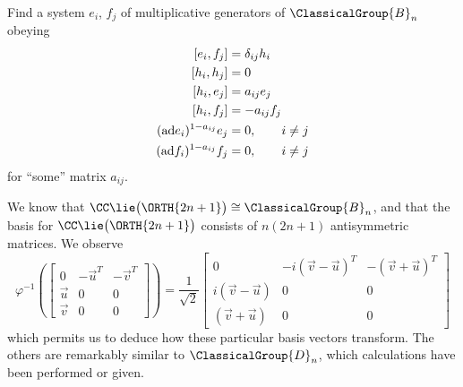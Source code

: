 \begin{exercise}
Find a system $e_{i}$, $f_{j}$ of multiplicative generators of
$\ClassicalGroup{B}_{n}$ obeying
\begin{subequations}
\begin{align}
[e_{i},f_{j}]&=\delta_{ij}h_{i}\\
[h_{i},h_{j}]&=0\\
[h_{i},e_{j}]&=a_{ij}e_{j}\\
[h_{i},f_{j}]&=-a_{ij}f_{j}\\
({\rm ad}e_{i})^{1-a_{ij}}e_{j}&=0,\qquad i\not=j\\
({\rm ad}f_{i})^{1-a_{ij}}f_{j}&=0,\qquad i\not=j
\end{align}
\end{subequations}
for ``some'' matrix $a_{ij}$.
\end{exercise}
\answer We know that $\CC\lie\big(\ORTH{2n+1}\big)\cong \ClassicalGroup{B}_{n}$, and that
the basis for $\CC\lie\big(\ORTH{2n+1}\big)$ consists of $n(2n+1)$
antisymmetric matrices. We observe
\begin{equation}
\varphi^{-1}\left(
\begin{bmatrix}
0 & -\vec{u}^{T} & -\vec{v}^{T}\\
\vec{u} & 0 & 0\\
\vec{v} & 0 & 0
\end{bmatrix}
\right)
=
\frac{1}{\sqrt{2}}\begin{bmatrix}
0                   & -i(\vec{v}-\vec{u})^{T} & -(\vec{v}+\vec{u})^{T}\\
i(\vec{v}-\vec{u})  & 0                      &0\\
(\vec{v}+\vec{u})   & 0                      &0
\end{bmatrix}
\end{equation}
which permits us to deduce how these particular basis vectors
transform. The others are remarkably similar to $\ClassicalGroup{D}_{n}$, which
calculations have been performed or given.

